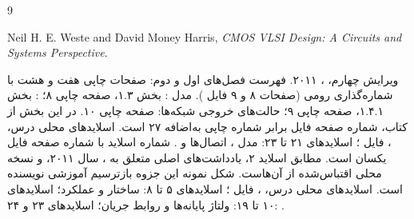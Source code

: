 \documentclass[12pt,a4paper]{article}
\newcommand{\secnum}[1]{\mbox{\beginL#1\endL}}
\begin{document}
\MakeAssignmentCover

\clearpage

\clearpage
\begin{thebibliography}{9}
\begin{latin}
Neil H. E. Weste and David Money Harris,
\textit{CMOS VLSI Design: A Circuits and Systems Perspective}.
\end{latin}
ویرایش چهارم، ، ۲۰۱۱.
فهرست فصل‌های اول و دوم: صفحات چاپی هفت و هشت با شماره‌گذاری رومی
(صفحات ۸ و ۹ فایل ).
مدل : بخش \secnum{۱.۳}، صفحه چاپی ۸؛
: بخش \secnum{۱.۴.۱}، صفحه چاپی ۹؛
حالت‌های خروجی شبکه‌ها: صفحه چاپی ۱۰.
در این بخش از کتاب، شماره صفحه فایل برابر شماره چاپی به‌اضافه ۲۷ است.
اسلایدهای محلی درس، ، فایل ؛
اسلایدهای ۲۱ تا ۲۳: مدل ، اتصال‌ها و .
شماره اسلاید با شماره صفحه فایل یکسان است.
مطابق اسلاید ۲، یادداشت‌های اصلی متعلق به ، سال ۲۰۱۱،
و نسخه محلی اقتباس‌شده از آن‌هاست. شکل نمونه این جزوه بازترسیم آموزشی نویسنده است.
اسلایدهای محلی درس، ، فایل ؛
اسلایدهای ۵ تا ۸: ساختار و عملکرد؛ اسلایدهای ۱۰ تا ۱۹: ولتاژ پایانه‌ها و روابط جریان؛
اسلایدهای ۲۳ و ۲۴: .
\end{thebibliography}
\end{document}
